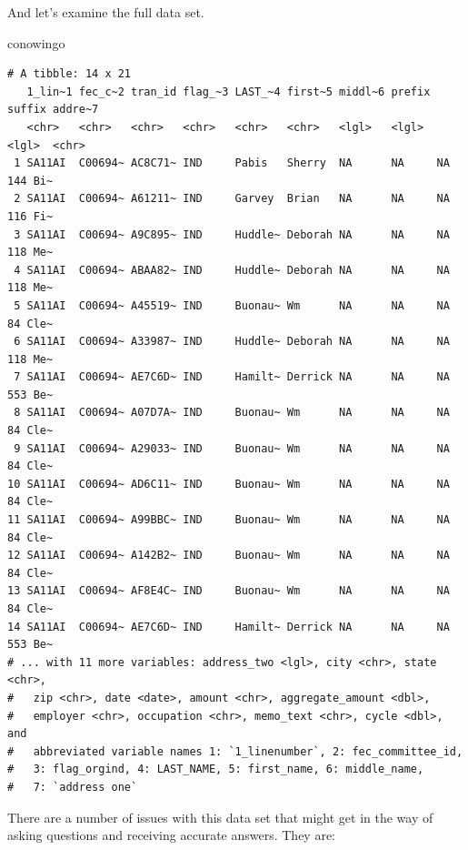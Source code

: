 \documentclass[
  letterpaper,
  DIV=11,
  numbers=noendperiod]{scrreprt}
\newenvironment{Shaded}{\begin{snugshade}}{\end{snugshade}}
\newcommand{\NormalTok}[1]{\textcolor[rgb]{0.00,0.23,0.31}{#1}}
\begin{document}
And let's examine the full data set.

\begin{Shaded}
\begin{Highlighting}[]
\NormalTok{conowingo}
\end{Highlighting}
\end{Shaded}

\begin{verbatim}
# A tibble: 14 x 21
   1_lin~1 fec_c~2 tran_id flag_~3 LAST_~4 first~5 middl~6 prefix suffix addre~7
   <chr>   <chr>   <chr>   <chr>   <chr>   <chr>   <lgl>   <lgl>  <lgl>  <chr>  
 1 SA11AI  C00694~ AC8C71~ IND     Pabis   Sherry  NA      NA     NA     144 Bi~
 2 SA11AI  C00694~ A61211~ IND     Garvey  Brian   NA      NA     NA     116 Fi~
 3 SA11AI  C00694~ A9C895~ IND     Huddle~ Deborah NA      NA     NA     118 Me~
 4 SA11AI  C00694~ ABAA82~ IND     Huddle~ Deborah NA      NA     NA     118 Me~
 5 SA11AI  C00694~ A45519~ IND     Buonau~ Wm      NA      NA     NA     84 Cle~
 6 SA11AI  C00694~ A33987~ IND     Huddle~ Deborah NA      NA     NA     118 Me~
 7 SA11AI  C00694~ AE7C6D~ IND     Hamilt~ Derrick NA      NA     NA     553 Be~
 8 SA11AI  C00694~ A07D7A~ IND     Buonau~ Wm      NA      NA     NA     84 Cle~
 9 SA11AI  C00694~ A29033~ IND     Buonau~ Wm      NA      NA     NA     84 Cle~
10 SA11AI  C00694~ AD6C11~ IND     Buonau~ Wm      NA      NA     NA     84 Cle~
11 SA11AI  C00694~ A99BBC~ IND     Buonau~ Wm      NA      NA     NA     84 Cle~
12 SA11AI  C00694~ A142B2~ IND     Buonau~ Wm      NA      NA     NA     84 Cle~
13 SA11AI  C00694~ AF8E4C~ IND     Buonau~ Wm      NA      NA     NA     84 Cle~
14 SA11AI  C00694~ AE7C6D~ IND     Hamilt~ Derrick NA      NA     NA     553 Be~
# ... with 11 more variables: address_two <lgl>, city <chr>, state <chr>,
#   zip <chr>, date <date>, amount <chr>, aggregate_amount <dbl>,
#   employer <chr>, occupation <chr>, memo_text <chr>, cycle <dbl>, and
#   abbreviated variable names 1: `1_linenumber`, 2: fec_committee_id,
#   3: flag_orgind, 4: LAST_NAME, 5: first_name, 6: middle_name,
#   7: `address one`
\end{verbatim}

There are a number of issues with this data set that might get in the
way of asking questions and receiving accurate answers. They are:
\end{document}
